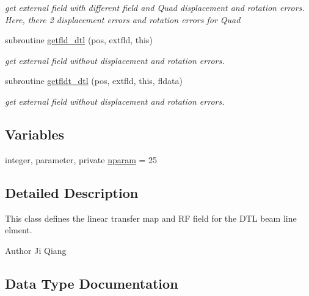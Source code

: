\begin{DoxyCompactItemize}
\begin{DoxyCompactList}\small\item\em get external field with different field and Quad displacement and rotation errors. Here, there 2 displacement errors and rotation errors for Quad \end{DoxyCompactList}\item 
subroutine \mbox{\hyperlink{namespacedtlclass_a9e97d93c8f7ec49afee134e3ffd3f900}{getfld\+\_\+dtl}} (pos, extfld, this)
\begin{DoxyCompactList}\small\item\em get external field without displacement and rotation errors. \end{DoxyCompactList}\item 
subroutine \mbox{\hyperlink{namespacedtlclass_aef6d69ea2a551751181175c270a8b745}{getfldt\+\_\+dtl}} (pos, extfld, this, fldata)
\begin{DoxyCompactList}\small\item\em get external field without displacement and rotation errors. \end{DoxyCompactList}\end{DoxyCompactItemize}
\subsection*{Variables}
\begin{DoxyCompactItemize}
\item 
integer, parameter, private \mbox{\hyperlink{namespacedtlclass_adf04761c96168c3dc492c89c72194cea}{nparam}} = 25
\end{DoxyCompactItemize}


\subsection{Detailed Description}
This class defines the linear transfer map and RF field for the D\+TL beam line elment. 

\begin{DoxyAuthor}{Author}
Ji Qiang 
\end{DoxyAuthor}


\subsection{Data Type Documentation}
\label{structdtlclass_1_1dtl}
